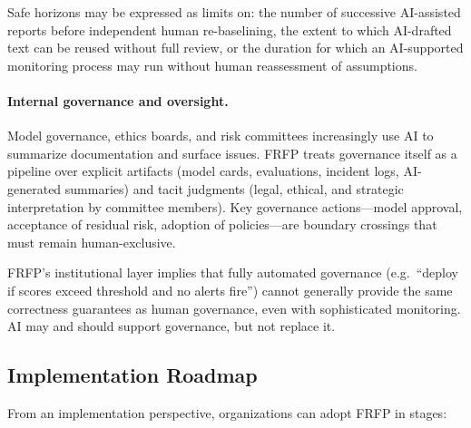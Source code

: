 Safe horizons may be expressed as limits on:
the number of successive AI-assisted reports before independent human re-baselining,
the extent to which AI-drafted text can be reused without full review,
or the duration for which an AI-supported monitoring process may run without human reassessment of assumptions.

\paragraph{Internal governance and oversight.}
Model governance, ethics boards, and risk committees increasingly use AI to summarize documentation and surface issues.
FRFP treats governance itself as a pipeline over explicit artifacts (model cards, evaluations, incident logs, AI-generated summaries) and tacit judgments (legal, ethical, and strategic interpretation by committee members).
Key governance actions---model approval, acceptance of residual risk, adoption of policies---are boundary crossings that must remain human-exclusive.

FRFP's institutional layer implies that fully automated governance (e.g.\ ``deploy if scores exceed threshold and no alerts fire'') cannot generally provide the same correctness guarantees as human governance, even with sophisticated monitoring.
AI may and should support governance, but not replace it.

\subsection{Implementation Roadmap}

From an implementation perspective, organizations can adopt FRFP in stages:


